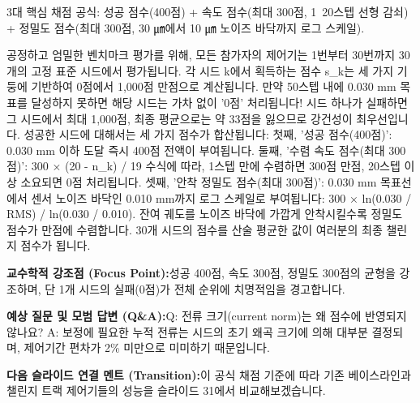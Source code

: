 \documentclass[11pt,a4paper]{article}
\begin{document}
\vspace{0.2em}
\begin{tcolorbox}[colback=lightbg,colframe=bordergray,title={\footnotesize\bfseries\color{darkgray}슬라이드 시각 구성 요약},fontupper=\small,left=6pt,right=6pt,top=2.5pt,bottom=2.5pt,boxrule=0.6pt,arc=2.5pt]
3대 핵심 채점 공식: 성공 점수(400점) + 속도 점수(최대 300점, 1~20스텝 선형 감쇠) + 정밀도 점수(최대 300점, 30 ㎛에서 10 ㎛ 노이즈 바닥까지 로그 스케일).
\end{tcolorbox}
\vspace{0.2em}
\begin{tcolorbox}[colback=white,colframe=primaryblue,title={\footnotesize\bfseries\color{white}발표자 구두 대본 (Spoken Script)},fontupper=\small,left=6pt,right=6pt,top=3pt,bottom=3pt,boxrule=0.8pt,arc=2.5pt]
공정하고 엄밀한 벤치마크 평가를 위해, 모든 참가자의 제어기는 1번부터 30번까지 30개의 고정 표준 시드에서 평가됩니다. 각 시드 k에서 획득하는 점수 s\_k는 세 가지 기둥에 기반하여 0점에서 1,000점 만점으로 계산됩니다. 만약 50스텝 내에 0.030 mm 목표를 달성하지 못하면 해당 시드는 가차 없이 '0점' 처리됩니다! 시드 하나가 실패하면 그 시드에서 최대 1,000점, 최종 평균으로는 약 33점을 잃으므로 강건성이 최우선입니다. 성공한 시드에 대해서는 세 가지 점수가 합산됩니다: 첫째, '성공 점수(400점)': 0.030 mm 이하 도달 즉시 400점 전액이 부여됩니다. 둘째, '수렴 속도 점수(최대 300점)': 300 × (20 - n\_k) / 19 수식에 따라, 1스텝 만에 수렴하면 300점 만점, 20스텝 이상 소요되면 0점 처리됩니다. 셋째, '안착 정밀도 점수(최대 300점)': 0.030 mm 목표선에서 센서 노이즈 바닥인 0.010 mm까지 로그 스케일로 부여됩니다: 300 × ln(0.030 / RMS) / ln(0.030 / 0.010). 잔여 궤도를 노이즈 바닥에 가깝게 안착시킬수록 정밀도 점수가 만점에 수렴합니다. 30개 시드의 점수를 산술 평균한 값이 여러분의 최종 챌린지 점수가 됩니다.
\end{tcolorbox}
\vspace{0.2em}
\begin{tcolorbox}[colback=lightbg,colframe=bordergray,left=6pt,right=6pt,top=3pt,bottom=3pt,boxrule=0.6pt,arc=2.5pt]
\small
\noindent\textbf{\color{navy}교수학적 강조점 (Focus Point):}\enspace 성공 400점, 속도 300점, 정밀도 300점의 균형을 강조하며, 단 1개 시드의 실패(0점)가 전체 순위에 치명적임을 경고합니다.\par\vspace{0.3em}
\noindent\textbf{\color{successgreen}예상 질문 및 모범 답변 (Q\&A):}\enspace Q: 전류 크기(current norm)는 왜 점수에 반영되지 않나요? A: 보정에 필요한 누적 전류는 시드의 초기 왜곡 크기에 의해 대부분 결정되며, 제어기간 편차가 2\% 미만으로 미미하기 때문입니다.\par\vspace{0.3em}
\noindent\textbf{\color{accent}다음 슬라이드 연결 멘트 (Transition):}\enspace 이 공식 채점 기준에 따라 기존 베이스라인과 챌린지 트랙 제어기들의 성능을 슬라이드 31에서 비교해보겠습니다.
\end{tcolorbox}
\end{document}
